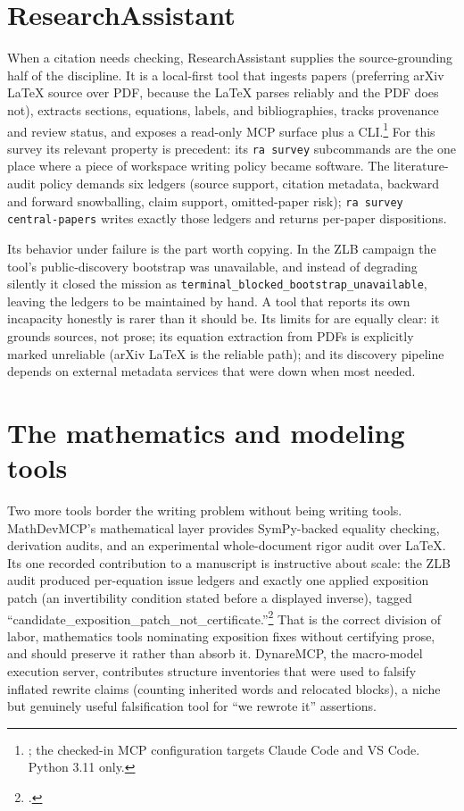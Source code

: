 \section{ResearchAssistant}
\label{sec:tool-ra}

When a citation needs checking, ResearchAssistant supplies the source-grounding
half of the discipline. It is a local-first tool that ingests papers (preferring arXiv LaTeX source over PDF,
because the LaTeX parses reliably and the PDF does not), extracts sections,
equations, labels, and bibliographies, tracks provenance and review status,
and exposes a read-only MCP surface plus a
CLI.\footnote{; the checked-in MCP configuration targets Claude Code and VS Code. Python 3.11 only.}
For this survey its relevant property is precedent: its \texttt{ra survey}
subcommands are the one place where a piece of workspace writing policy
became software. The literature-audit policy demands six ledgers (source
support, citation metadata, backward and forward snowballing, claim support,
omitted-paper risk); \texttt{ra survey central-papers} writes exactly those
ledgers and returns per-paper dispositions.

Its behavior under failure is the part worth copying. In the ZLB campaign
the tool's public-discovery bootstrap was unavailable, and instead of
degrading silently it closed the mission as
\texttt{terminal\_blocked\_bootstrap\_unavailable}, leaving the ledgers to be
maintained by hand. A tool that reports its own incapacity honestly is rarer
than it should be. Its limits for \hv{} are equally clear: it grounds
sources, not prose; its equation extraction from PDFs is explicitly marked
unreliable (arXiv LaTeX is the reliable path); and its discovery pipeline
depends on external metadata services that were down when most needed.

\section{The mathematics and modeling tools}
\label{sec:tool-math}

Two more tools border the writing problem without being writing tools.
MathDevMCP's mathematical layer provides SymPy-backed equality checking,
derivation audits, and an experimental whole-document rigor audit over
LaTeX. Its one recorded contribution to a manuscript is instructive about
scale: the ZLB audit produced per-equation issue ledgers and exactly one
applied exposition patch (an invertibility condition stated before a
displayed inverse), tagged
``candidate\_exposition\_patch\_not\_certificate.''\footnote{.}
That is the correct division of labor, mathematics tools nominating exposition
fixes without certifying prose, and \hv{} should preserve it rather than
absorb it. DynareMCP, the macro-model execution server, contributes structure
inventories that were used to falsify inflated rewrite claims (counting
inherited words and relocated blocks), a niche but genuinely useful
falsification tool for ``we rewrote it'' assertions.


